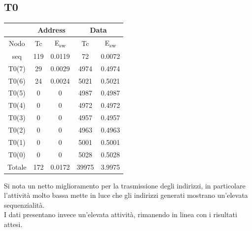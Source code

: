 \documentclass[11pt,  english, makeidx, a4paper, titlepage, oneside]{book}
\begin{document}
\subsection{T0}
\begin{center}
	\begin{tabular}{|c|c|c||c|c|}
	\hline
	& \multicolumn{2}{|c||}{Address} & \multicolumn{2}{|c|}{Data}\\
	\hline
	Nodo & Tc & E\textsubscript{sw} & Tc & E\textsubscript{sw} \\
	\hline
	seq & 119 & 0.0119 & 72 & 0.0072  \\
	\hline
	T0(7) & 29 & 0.0029 & 4974 & 0.4974\\
	 \hline
	T0(6) & 24 & 0.0024 & 5021 & 0.5021\\
	\hline
	T0(5) & 0 & 0 & 4987 & 0.4987\\
	\hline
	T0(4) & 0 & 0 & 4972 & 0.4972\\
	\hline
	T0(3) & 0 & 0 & 4957 & 0.4957\\
	\hline
	T0(2) & 0 & 0 & 4963 & 0.4963\\
	\hline
	T0(1) & 0 & 0 & 5001 & 0.5001\\
	\hline
	T0(0) & 0 & 0 & 5028 & 0.5028\\
	\hline
	Totale & 172 & 0.0172 & 39975 & 3.9975\\
	\hline
	\end{tabular}	
\end{center}
\vspace{0.3cm}
Si nota un netto miglioramento per la trasmissione degli indirizzi, in particolare l'attività molto bassa mette in luce che gli indirizzi generati mostrano un'elevata sequenzialità.
\\
I dati presentano invece un'elevata attività, rimanendo in linea con i risultati attesi.
\newpage
\end{document}
